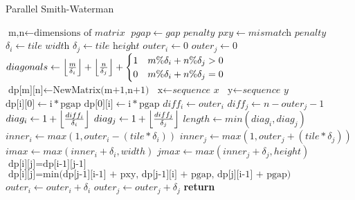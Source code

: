 

\begin{algorithm}
\caption{Parallel Smith-Waterman}\label{alg:parsmith}
\begin{algorithmic}[1]
\State $\text{m,n} \gets \text{dimensions of }\textit{matrix}$
\State $pgap \gets \textit{gap penalty}$
\State $pxy \gets \textit{mismatch penalty}$
\State $\delta_i \gets \textit{tile width}$
\State $\delta_j \gets \textit{tile height}$
\State $outer_i \gets 0$
\State $outer_j \gets 0$
\State $diagonals \gets \left\lfloor \frac{m}{\delta_i} \right\rfloor + \left\lfloor \frac{n}{\delta_j} \right\rfloor + \begin{cases} 
      1 & m\%\delta_i + n\%\delta_j > 0 \\
      0 & m\%\delta_i + n\%\delta_j = 0 \\
    \end{cases}$
\State $\text{dp[m][n]} \gets \text{NewMatrix(m+1,n+1)}$
\State $\text{x} \gets \textit{sequence x}$
\State $\text{y} \gets \textit{sequence y}$
    \State $\text{dp[i][0]} \gets \text{i} * \text{pgap}$
\EndFor
{}
    \State $\text{dp[0][i]} \gets \text{i} * \text{pgap}$
\EndFor
\For{$\text{i} \gets [0 \ldots diagonals)$}
    \State $diff_i \gets outer_i$
    \State $diff_j \gets n-outer_j-1$
    \State $diag_i \gets 1 + \left\lfloor \frac{diff_i}{\delta_i} \right\rfloor$
    \State $diag_j \gets 1 + \left\lfloor \frac{diff_j}{\delta_j} \right\rfloor$
    \State $length \gets min(diag_i, diag_j)$
    \For{$\text{tile} \gets [0 \ldots length) \textbf{ parallel} $}
        \State $inner_i \gets max(1, outer_i - (tile*\delta_i))$
        \State $inner_j \gets max(1, outer_j + (tile*\delta_j))$
    	\State $imax \gets max(inner_i + \delta_i, width)$
    	\State $jmax \gets max(inner_j + \delta_j, height)$
        		    \State $\text{dp[i][j]} = \text{dp[i-1][j-1]}$
        	    \Else
        		    \State $\text{dp[i][j]} = \text{min(dp[j-1][i-1] + pxy, dp[j-1][i] + pgap, dp[j][i-1] + pgap)}$
        	    \EndIf
            \EndFor
        \EndFor
    \EndFor
        \State $outer_i \gets outer_i + \delta_i$
    \Else
        \State $outer_j \gets outer_j + \delta_j$
    \EndIf
\EndFor
\textbf{return } 
\EndProcedure
\end{algorithmic}
\end{algorithm}